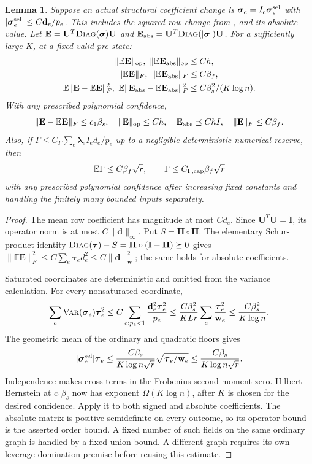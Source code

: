 \documentclass[11pt]{article}
\newtheorem{lemma}[theorem]{Lemma}
\theoremstyle{remark}
\newcommand{\II}{\mathbf I}
\newcommand{\PPi}{\boldsymbol{\Pi}}
\newcommand{\UU}{\mathbf U}
\newcommand{\llambda}{\boldsymbol{\lambda}}
\newcommand{\ttau}{\boldsymbol{\tau}}
\newcommand{\ww}{\mathbf w}
\newcommand{\ssigma}{\boldsymbol{\sigma}}
\newcommand{\EE}{\mathbf E}
\newcommand{\dd}{\mathbf d}
\newcommand{\diag}{\textsc{Diag}}
\newcommand{\Ex}{\mathbb E}
\newcommand{\norm}[1]{\lVert#1\rVert}
\newcommand{\Var}{\textsc{Var}}
\begin{document}
\begin{lemma}
\label{lem:ram-matrix-moments}
Suppose an actual structural coefficient change is $\ssigma_e=I_e\ssigma_e^{\rm sel}$ with
$|\ssigma_e^{\rm sel}|\le C \dd_e/p_e$.
This includes the squared row change from , and its
absolute value.
Let $\EE=\UU^T\diag(\ssigma)\UU$ and $\EE_{\rm abs}=\UU^T\diag(|\ssigma|)\UU$.
For a sufficiently large $K$, at a fixed valid pre-state:
\begin{align*}
 \norm{\Ex \EE}_{\rm op},\ \norm{\Ex \EE_{\rm abs}}_{\rm op}
       &\le Ch,\\
 \norm{\Ex \EE}_F,\ \norm{\Ex \EE_{\rm abs}}_F&\le C\beta_f,\\
 \Ex\norm{\EE-\Ex \EE}_F^2,
 \ \Ex\norm{\EE_{\rm abs}-\Ex \EE_{\rm abs}}_F^2
       &\le C\beta_s^2/(K\log n).
\end{align*}
With any prescribed polynomial confidence,
\[
 \norm{\EE-\Ex \EE}_F\le c_1\beta_s,\quad
 \norm{\EE}_{\rm op}\le Ch,\quad
 \EE_{\rm abs}\preceq ChI,\quad \norm{\EE}_F\le C\beta_f.
\]
Also, if $\Gamma\le C_\Gamma\sum_e\llambda_eI_ed_e/p_e$ up to a negligible
deterministic numerical reserve, then
\[
 \Ex\Gamma\le C\beta_f\sqrt r,
 \qquad \Gamma\le C_{\Gamma,\rm cap}\beta_f\sqrt r
\]
with any prescribed polynomial confidence after increasing fixed constants and
handling the finitely many bounded inputs separately.
\end{lemma} \begin{proof} The mean row coefficient has magnitude at most $Cd_e$.
Since $\UU^T\UU=\II$, its operator norm is at most $C\norm{\dd}_\infty$.
Put $S=\PPi\circ\PPi$.
The elementary Schur-product identity $\diag(\ttau)-S=\PPi\circ(\II-\PPi)\succeq0$
gives $\norm{\Ex \EE}_F^2\le C\sum_e\ttau_ed_e^2 \le C\norm{\dd}_{\ww}^2$; the same holds
for absolute coefficients.

Saturated coordinates are deterministic and omitted from the variance
calculation.
For every nonsaturated coordinate,
\[
 \sum_e\Var(\ssigma_e)\ttau_e^2
 \le C\sum_{e:p_e<1}\frac{\dd_e^2\ttau_e^2}{p_e}
 \le\frac{C\beta_s^2}{KLr}\sum_e\frac{\ttau_e^2}{\ww_e}
 \le\frac{C\beta_s^2}{K\log n}.
\]
The geometric mean of the ordinary and quadratic floors gives
\[
 |\ssigma_e^{\rm sel}|\ttau_e
 \le\frac{C\beta_s}{K\log n\sqrt r}
           \sqrt{\ttau_e/\ww_e}
 \le\frac{C\beta_s}{K\log n\sqrt r}.
\]
Independence makes cross terms in the Frobenius second moment zero.
Hilbert Bernstein at $c_1\beta_s$ now has exponent $\Omega(K\log n)$, after $K$ is
chosen for the desired confidence.
Apply it to both signed and absolute coefficients.
The absolute matrix is positive semidefinite on every outcome, so its operator
bound is the asserted order bound.
A fixed number of such fields on the same ordinary graph is handled by a fixed
union bound.
A different graph requires its own leverage-domination premise before reusing
this estimate.


\end{proof}
\end{document}
